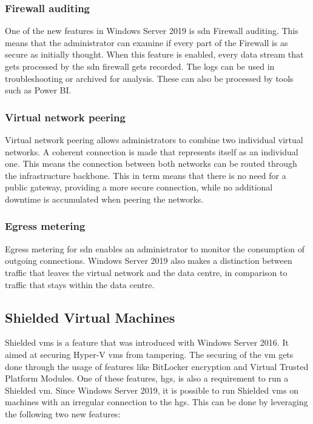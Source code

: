 \subsubsection{Firewall auditing}
One of the new features in Windows Server 2019 is \acrshort{sdn} Firewall auditing. 
This means that the administrator can examine if every part of the Firewall is as secure as initially thought. 
When this feature is enabled, every data stream that gets processed by the \acrshort{sdn} firewall gets recorded. 
The logs can be used in troubleshooting or archived for analysis. 
These can also be processed by tools such as Power BI.

\subsubsection{Virtual network peering}
Virtual network peering allows administrators to combine two individual virtual networks. 
A coherent connection is made that represents itself as an individual one. 
This means the connection between both networks can be routed through the infrastructure backbone. 
This in term means that there is no need for a public gateway, providing a more secure connection, while no additional downtime is accumulated when peering the networks.

\subsubsection{Egress metering}
Egress metering for \acrshort{sdn} enables an administrator to monitor the consumption of outgoing connections.
Windows Server 2019 also makes a distinction between traffic that leaves the virtual network and the data centre, in comparison to traffic that stays within the data centre. 

\subsection{Shielded Virtual Machines}
Shielded \acrshort{vm}s is a feature that was introduced with Windows Server 2016. It aimed at securing Hyper-V \acrshort{vm}s from tampering. The securing of the \acrshort{vm} gets done through the usage of features like BitLocker encryption and Virtual Trusted Platform Modules. 
One of these features, \acrfull{hgs}, is also a requirement to run a Shielded \acrshort{vm}. 
Since Windows Server 2019, it is possible to run Shielded \acrshort{vm}s on machines with an irregular connection to the \acrshort{hgs}. 
This can be done by leveraging the following two new features:

